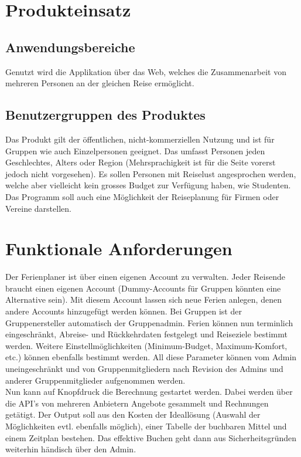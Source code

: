 \documentclass[10pt,a4paper,titlepage,twoside,german]{zhawreprt}
\begin{document}
\chapter{Produkteinsatz}\label{chp:ProductApplication}
\section{Anwendungsbereiche}\label{sec:FieldOfApplience}
Genutzt wird die Applikation über das Web, welches die Zusammenarbeit von mehreren Personen an der gleichen Reise ermöglicht.
\section{Benutzergruppen des Produktes}\label{sec:TargetAudience}
Das Produkt gilt der öffentlichen, nicht-kommerziellen Nutzung und ist für Gruppen wie auch Einzelpersonen geeignet. Das umfasst Personen jeden Geschlechtes, Alters oder Region (Mehrsprachigkeit ist für die Seite vorerst jedoch nicht vorgesehen). Es sollen Personen mit Reiselust angesprochen werden, welche aber vielleicht kein grosses Budget zur Verfügung haben, wie Studenten. Das Programm soll auch eine Möglichkeit der Reiseplanung für Firmen oder Vereine darstellen.
\chapter{Funktionale Anforderungen}\label{chp:FunctionalRequirements}
Der Ferienplaner ist über einen eigenen Account zu verwalten. Jeder Reisende braucht einen eigenen Account (Dummy-Accounts für Gruppen könnten eine Alternative sein). Mit diesem Account lassen sich neue Ferien anlegen, denen andere Accounts hinzugefügt werden können. Bei Gruppen ist der Gruppenersteller automatisch der Gruppenadmin. Ferien können nun terminlich eingeschränkt, Abreise- und Rückkehrdaten festgelegt und Reiseziele bestimmt werden. Weitere Einstellmöglichkeiten (Minimum-Budget, Maximum-Komfort, etc.) können ebenfalls bestimmt werden. All diese Parameter können vom Admin uneingeschränkt und von Gruppenmitgliedern nach Revision des Admins und anderer Gruppenmitglieder aufgenommen werden.\\
Nun kann auf Knopfdruck die Berechnung gestartet werden. Dabei werden über die API's von mehreren Anbietern Angebote gesammelt und Rechnungen getätigt. Der Output soll aus den Kosten der Ideallösung (Auswahl der Möglichkeiten evtl. ebenfalls möglich), einer Tabelle der buchbaren Mittel und einem Zeitplan bestehen. Das effektive Buchen geht dann aus Sicherheitsgründen weiterhin händisch über den Admin.
\end{document}
